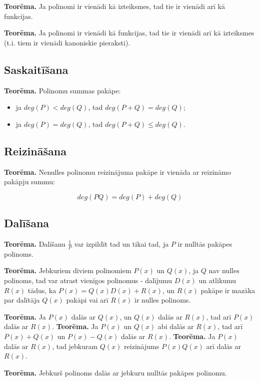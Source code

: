 \documentclass{article}
\begin{document}
\textbf{Teorēma.} Ja polinomi ir vienādi kā izteiksmes, tad tie ir vienādi arī kā funkcijas.

\textbf{Teorēma.} Ja polinomi ir vienādi kā funkcijas, tad tie ir vienādi arī kā izteiksmes (t.i. tiem ir vienādi kanoniskie pieraksti).

\subsection{Saskaitīšana}

\textbf{Teorēma.} Polinomu summas pakāpe:
\begin{itemize}
	\item ja $deg(P)<deg(Q)$, tad $deg(P+Q)=deg(Q)$;
	\item ja $deg(P)=deg(Q)$, tad $deg(P+Q) \le deg(Q)$.
\end{itemize}

\subsection{Reizināšana}

\textbf{Teorēma.} Nenulles polinomu reizinājuma pakāpe ir vienāda ar reizināmo pakāpju summu:

\begin{equation}
	deg(PQ) = deg(P)+deg(Q)
\end{equation}

\subsection{Dalīšana}

\textbf{Teorēma.} Dalīšanu $\frac{1}{P}$ var izpildīt tad un tikai tad, ja $P$ ir nulltās pakāpes polinoms.


\textbf{Teorēma.} Jebkuriem diviem polinomiem $P(x)$ un $Q(x)$, ja $Q$ nav nulles polinoms, tad var atrast vienīgos polinomus - dalījumu $D(x)$ un atlikumu $R(x)$ tādus, ka $P(x)=Q(x)D(x)+R(x)$, un $R(x)$ pakāpe ir mazāka par dalītāja $Q(x)$ pakāpi vai arī $R(x)$ ir nulles polinoms.

\textbf{Teorēma.} Ja $P(x)$ dalās ar $Q(x)$, un $Q(x)$ dalās ar $R(x)$, tad arī $P(x)$ dalās ar $R(x)$.
\textbf{Teorēma.} Ja $P(x)$ un $Q(x)$ abi dalās ar $R(x)$, tad arī $P(x)+Q(x)$ un $P(x)−Q(x)$ dalās ar $R(x)$.
\textbf{Teorēma.} Ja $P(x)$ dalās ar $R(x)$, tad jebkuram $Q(x)$ reizinājums $P(x)Q(x)$ arī dalās ar $R(x)$.

\textbf{Teorēma.} Jebkurš polinoms dalās ar jebkuru nulltās pakāpes polinomu.
\end{document}
